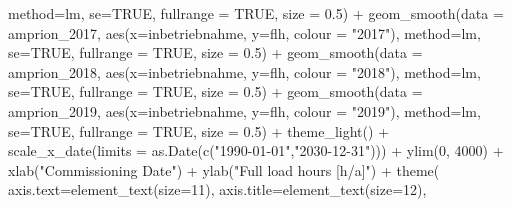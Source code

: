 \documentclass[a4paper,11pt]{article}
\newenvironment{Shaded}{\begin{snugshade}}{\end{snugshade}}
\newcommand{\AttributeTok}[1]{\textcolor[rgb]{0.77,0.63,0.00}{#1}}
\newcommand{\ConstantTok}[1]{\textcolor[rgb]{0.00,0.00,0.00}{#1}}
\newcommand{\DecValTok}[1]{\textcolor[rgb]{0.00,0.00,0.81}{#1}}
\newcommand{\FloatTok}[1]{\textcolor[rgb]{0.00,0.00,0.81}{#1}}
\newcommand{\FunctionTok}[1]{\textcolor[rgb]{0.00,0.00,0.00}{#1}}
\newcommand{\NormalTok}[1]{#1}
\newcommand{\SpecialCharTok}[1]{\textcolor[rgb]{0.00,0.00,0.00}{#1}}
\newcommand{\StringTok}[1]{\textcolor[rgb]{0.31,0.60,0.02}{#1}}
\begin{document}
\begin{Shaded}
\begin{Highlighting}[]
              \AttributeTok{method=}\NormalTok{lm, }\AttributeTok{se=}\ConstantTok{TRUE}\NormalTok{, }\AttributeTok{fullrange =} \ConstantTok{TRUE}\NormalTok{, }\AttributeTok{size =} \FloatTok{0.5}\NormalTok{)  }\SpecialCharTok{+}
  \FunctionTok{geom\_smooth}\NormalTok{(}\AttributeTok{data =}\NormalTok{ amprion\_2017, }
              \FunctionTok{aes}\NormalTok{(}\AttributeTok{x=}\NormalTok{inbetriebnahme, }\AttributeTok{y=}\NormalTok{flh, }\AttributeTok{colour =} \StringTok{"2017"}\NormalTok{), }
              \AttributeTok{method=}\NormalTok{lm, }\AttributeTok{se=}\ConstantTok{TRUE}\NormalTok{, }\AttributeTok{fullrange =} \ConstantTok{TRUE}\NormalTok{, }\AttributeTok{size =} \FloatTok{0.5}\NormalTok{)  }\SpecialCharTok{+}
  \FunctionTok{geom\_smooth}\NormalTok{(}\AttributeTok{data =}\NormalTok{ amprion\_2018, }
              \FunctionTok{aes}\NormalTok{(}\AttributeTok{x=}\NormalTok{inbetriebnahme, }\AttributeTok{y=}\NormalTok{flh, }\AttributeTok{colour =} \StringTok{"2018"}\NormalTok{),}
              \AttributeTok{method=}\NormalTok{lm, }\AttributeTok{se=}\ConstantTok{TRUE}\NormalTok{, }\AttributeTok{fullrange =} \ConstantTok{TRUE}\NormalTok{, }\AttributeTok{size =} \FloatTok{0.5}\NormalTok{)  }\SpecialCharTok{+}
  \FunctionTok{geom\_smooth}\NormalTok{(}\AttributeTok{data =}\NormalTok{ amprion\_2019, }
              \FunctionTok{aes}\NormalTok{(}\AttributeTok{x=}\NormalTok{inbetriebnahme, }\AttributeTok{y=}\NormalTok{flh, }\AttributeTok{colour =} \StringTok{"2019"}\NormalTok{), }
              \AttributeTok{method=}\NormalTok{lm, }\AttributeTok{se=}\ConstantTok{TRUE}\NormalTok{, }\AttributeTok{fullrange =} \ConstantTok{TRUE}\NormalTok{, }\AttributeTok{size =} \FloatTok{0.5}\NormalTok{)  }\SpecialCharTok{+}
  \FunctionTok{theme\_light}\NormalTok{() }\SpecialCharTok{+}
  \FunctionTok{scale\_x\_date}\NormalTok{(}\AttributeTok{limits =} \FunctionTok{as.Date}\NormalTok{(}\FunctionTok{c}\NormalTok{(}\StringTok{"1990{-}01{-}01"}\NormalTok{,}\StringTok{"2030{-}12{-}31"}\NormalTok{))) }\SpecialCharTok{+}
  \FunctionTok{ylim}\NormalTok{(}\DecValTok{0}\NormalTok{, }\DecValTok{4000}\NormalTok{) }\SpecialCharTok{+}
  \FunctionTok{xlab}\NormalTok{(}\StringTok{"Commissioning Date"}\NormalTok{) }\SpecialCharTok{+}
  \FunctionTok{ylab}\NormalTok{(}\StringTok{"Full load hours [h/a]"}\NormalTok{) }\SpecialCharTok{+}
  \FunctionTok{theme}\NormalTok{( }\AttributeTok{axis.text=}\FunctionTok{element\_text}\NormalTok{(}\AttributeTok{size=}\DecValTok{11}\NormalTok{),}
         \AttributeTok{axis.title=}\FunctionTok{element\_text}\NormalTok{(}\AttributeTok{size=}\DecValTok{12}\NormalTok{),}

\end{Highlighting}
\end{Shaded}
\end{document}
